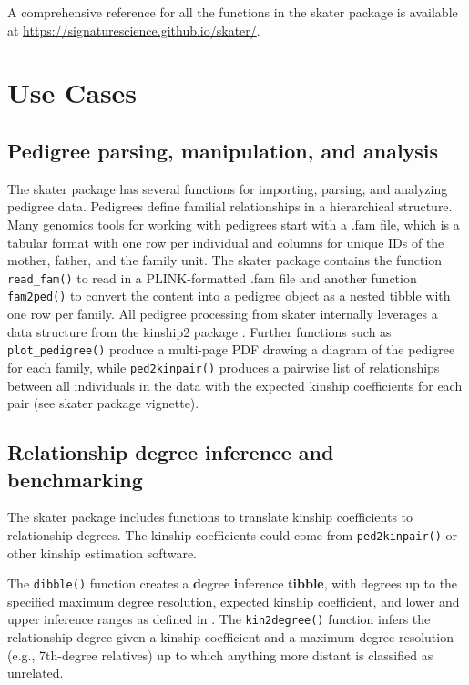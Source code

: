 \documentclass[9pt,a4paper,]{extarticle}
\begin{document}
A comprehensive reference for all the functions in the skater package is available at \url{https://signaturescience.github.io/skater/}.

\hypertarget{use-cases}{%
\section{Use Cases}\label{use-cases}}

\hypertarget{pedigree-parsing-manipulation-and-analysis}{%
\subsection{Pedigree parsing, manipulation, and analysis}\label{pedigree-parsing-manipulation-and-analysis}}

The skater package has several functions for importing, parsing, and analyzing pedigree data. Pedigrees define familial relationships in a hierarchical structure. Many genomics tools for working with pedigrees start with a .fam file, which is a tabular format with one row per individual and columns for unique IDs of the mother, father, and the family unit. The skater package contains the function \texttt{read\_fam()} to read in a PLINK-formatted .fam file and another function \texttt{fam2ped()} to convert the content into a pedigree object as a nested tibble with one row per family. All pedigree processing from skater internally leverages a data structure from the kinship2 package \citep{sinnwell2014}. Further functions such as \texttt{plot\_pedigree()} produce a multi-page PDF drawing a diagram of the pedigree for each family, while \texttt{ped2kinpair()} produces a pairwise list of relationships between all individuals in the data with the expected kinship coefficients for each pair (see skater package vignette).

\hypertarget{relationship-degree-inference-and-benchmarking}{%
\subsection{Relationship degree inference and benchmarking}\label{relationship-degree-inference-and-benchmarking}}

The skater package includes functions to translate kinship coefficients to relationship degrees. The kinship coefficients could come from \texttt{ped2kinpair()} or other kinship estimation software.

The \texttt{dibble()} function creates a \textbf{d}egree \textbf{i}nference t\textbf{ibble}, with degrees up to the specified maximum degree resolution, expected kinship coefficient, and lower and upper inference ranges as defined in \citet{manichaikul2010}. The \texttt{kin2degree()} function infers the relationship degree given a kinship coefficient and a maximum degree resolution (e.g., 7th-degree relatives) up to which anything more distant is classified as unrelated.
\end{document}
